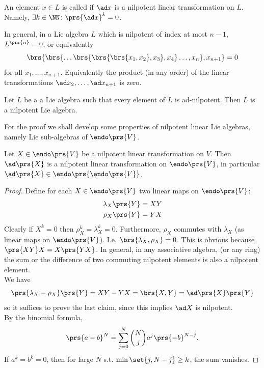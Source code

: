 \documentclass[10pt,a4paper,twoside,openany,hidelinks]{book}
\begin{document}
\begin{definition}
An element $x \in L$ is called  if $\ad x$ is a nilpotent linear transformation on $L$.
Namely, $\exists k \in \NN \colon \prs{\ad x}^k = 0$.
\end{definition}
\begin{remark}
In general, in a Lie algebra $L$ which is nilpotent of index at most $n-1$, $L^{\prs{n}}=0$, or equivalently
\[\brs{\brs{\ldots\brs{\brs{\brs{x_1, x_2},x_3},x_4}\ldots,x_n},x_{n+1}} = 0\]
for all $x_1, \ldots, x_{n+1}$. Equivalently the product (in any order) of the linear transformations $\ad x_2, \ldots, \ad x_{n+1}$ is zero.
\end{remark}
\begin{theorem}[Engel]
Let $L$ be a a Lie algebra such that every element of $L$ is ad-nilpotent. Then $L$ is a nilpotent Lie algebra.
\end{theorem}
For the proof we shall develop some properties of nilpotent linear Lie algebras, namely Lie sub-algebras of $\endo\prs{V}$.\\
\begin{proposition}
Let $X \in \endo \prs{V}$ be a nilpotent linear transformation on $V$. Then $\ad\prs{X}$ is a nilpotent linear transformation on $\endo\prs{V}$, in particular $\ad\prs{X} \in \endo\prs{\endo\prs{V}}$.
\end{proposition}
\begin{proof}
Define for each $X \in \endo\prs{V}$ two linear maps on $\endo\prs{V}$:
\begin{align*}
\lambda_X\prs{Y} = XY \\
\rho_X\prs{Y} = YX
\end{align*}
Clearly if $X^k = 0$ then $\rho_X^k = \lambda_X^k = 0$.
Furthermore, $\rho_X$ commutes with $\lambda_X$ (as linear maps on $\endo\prs{V}$). I.e. $\brs{\lambda_X,\rho_X} = 0$. This is obvious because $\prs{XY}X = X\prs{YX}$.
In general, in any associative algebra, (or any ring) the sum or the difference of two commuting nilpotent elements is also a nilpotent element.\\
We have \[\prs{\lambda_X - \rho_X}\prs{Y} = XY - YX = \brs{X,Y} = \ad\prs{X}\prs{Y}\] so it suffices to prove the last claim, since this implies $\ad X$ is nilpotent.\\
By the binomial formula,
\[\prs{a-b}^N = \sum_{j=0}^N \binom{N}{j} a^j \prs{-b}^{N-j}\text{.}\]
If $a^k = b^k = 0$, then for large $N$ s.t. $\min\set{j,N-j} \geq k$, the sum vanishes.
\end{proof}
\end{document}
